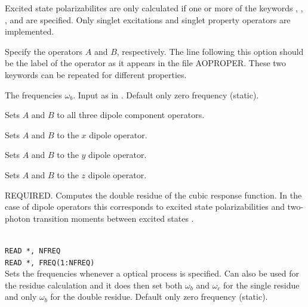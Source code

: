 Excited state polarizabilites are only calculated if one or more of the keywords
, , , and 
are specified.
Only singlet excitations and singlet property operators are implemented.

\begin{description}

\item[, ]
Specify the operators $A$ and $B$, respectively. The line following this
option should be the label of the operator as it appears in the file
AOPROPER. These two keywords can be repeated for different properties.

\item[]
The frequencies
$\omega_b$. Input as in .
Default only zero frequency (static).

\item{}
Sets $A$ and $B$ to all three dipole component operators.

\item{}
Sets $A$ and $B$ to the $x$ dipole operator.

\item{}
Sets $A$ and $B$ to the $y$ dipole operator.

\item{}
Sets $A$ and $B$ to the $z$ dipole operator.

\item{}
REQUIRED.
Computes the double residue of the cubic
response function.
In the case of dipole operators this corresponds to excited
state polarizabilities and two-photon transition
moments
between excited states \cite{djpnylhajcp105}.

\item{}\\
\verb|READ *, NFREQ|\\
\verb|READ *, FREQ(1:NFREQ)|\\
Sets the frequencies whenever a optical process is specified.
Can also be used for the residue calculation and it does then set
both $\omega_b$ and $\omega_c$ for the single residue and only
$\omega_b$ for the double residue.
Default only zero frequency (static).


\end{description}
